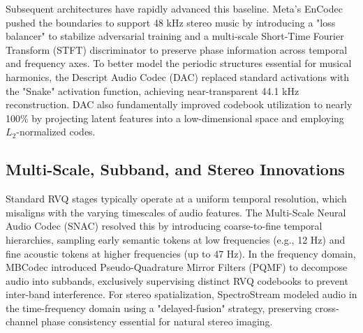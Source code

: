 \documentclass[12pt]{report}
\begin{document}
Subsequent architectures have rapidly advanced this baseline. Meta's EnCodec \cite{encodec} pushed the boundaries to support 48 kHz stereo music by introducing a "loss balancer" to stabilize adversarial training and a multi-scale Short-Time Fourier Transform (STFT) discriminator to preserve phase information across temporal and frequency axes. To better model the periodic structures essential for musical harmonics, the Descript Audio Codec (DAC) \cite{dac} replaced standard activations with the "Snake" activation function, achieving near-transparent 44.1 kHz reconstruction. DAC also fundamentally improved codebook utilization to nearly 100\% by projecting latent features into a low-dimensional space and employing $L_2$-normalized codes.

\subsection{Multi-Scale, Subband, and Stereo Innovations}
Standard RVQ stages typically operate at a uniform temporal resolution, which misaligns with the varying timescales of audio features. The Multi-Scale Neural Audio Codec (SNAC) \cite{snac} resolved this by introducing coarse-to-fine temporal hierarchies, sampling early semantic tokens at low frequencies (e.g., 12 Hz) and fine acoustic tokens at higher frequencies (up to 47 Hz). 
In the frequency domain, MBCodec \cite{mbcodec} introduced Pseudo-Quadrature Mirror Filters (PQMF) to decompose audio into subbands, exclusively supervising distinct RVQ codebooks to prevent inter-band interference. For stereo spatialization, SpectroStream \cite{spectrostream} modeled audio in the time-frequency domain using a "delayed-fusion" strategy, preserving cross-channel phase consistency essential for natural stereo imaging.

\end{document}
